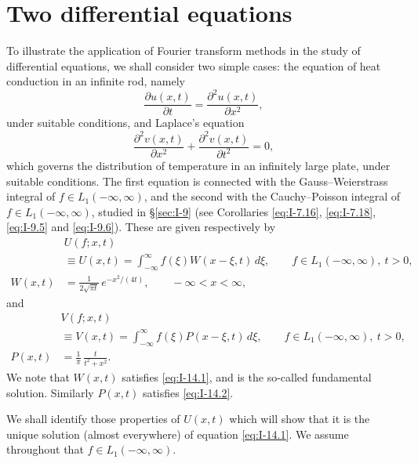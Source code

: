 \section{Two differential equations}
\label{sec:I-14}

To illustrate the application of Fourier transform methods in the study of differential equations, we shall consider two simple cases: the equation of heat conduction in an infinite rod, namely
\begin{equation}\label{eq:I-14.1}\tag{14.1}
\frac{\partial u(x,t)}{\partial t}=\frac{\partial^{2}u(x,t)}{\partial x^{2}},
\end{equation}
under suitable conditions, and Laplace's equation
\begin{equation}\label{eq:I-14.2}\tag{14.2}
\frac{\partial^{2}v(x,t)}{\partial x^{2}}+\frac{\partial^{2}v(x,t)}{\partial t^{2}}=0,
\end{equation}
which governs the distribution of temperature in an infinitely large plate, under suitable conditions. The first equation is connected with the Gauss--Weierstrass integral of $f\in L_1(-\infty,\infty)$, and the second with the Cauchy--Poisson integral of $f\in L_1(-\infty,\infty)$, studied in \S\ref{sec:I-9} (see Corollaries \eqref{eq:I-7.16}, \eqref{eq:I-7.18}, \eqref{eq:I-9.5} and \eqref{eq:I-9.6}). These are given respectively by
\begin{equation}\label{eq:I-14.3}\tag{14.3}
\begin{aligned}
&U(f;x,t)\\
&\equiv U(x,t) = \int_{-\infty}^{\infty}f(\xi)W(x-\xi,t)\,d\xi,  \qquad f\in L_1(-\infty,\infty),\ t > 0,\\
W(x,t)&=\frac{1}{2\sqrt{\pi t}}\,e^{-x^{2}/(4t)},\qquad-\infty<x<\infty,
\end{aligned}
\end{equation}
and
\begin{equation}\label{eq:I-14.4}\tag{14.4}
\begin{aligned}
&V(f;x,t)\\
&\equiv V(x,t) = \int_{-\infty}^{\infty}f(\xi)P(x-\xi,t)\,d\xi,  \qquad f\in L_1(-\infty,\infty),\ t > 0,\\
P(x,t)&=\frac{1}{\pi}\,\frac{t}{t^{2}+x^{2}}.
\end{aligned}
\end{equation}
We note that $W(x,t)$ satisfies \eqref{eq:I-14.1}, and is the so-called fundamental solution. Similarly $P(x,t)$ satisfies \eqref{eq:I-14.2}.

We shall identify those properties of $U(x,t)$ which will show that it is the unique solution (almost everywhere) of equation \eqref{eq:I-14.1}. We assume throughout that $f\in L_1(-\infty,\infty)$.

